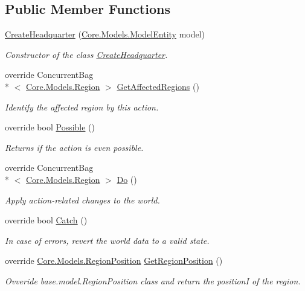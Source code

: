 \subsection*{Public Member Functions}
\begin{DoxyCompactItemize}
\item 
\hyperlink{classCore_1_1Controllers_1_1Actions_1_1CreateHeadquarter_a4c0fe65eb8038f6167d9d9fe42834ee8}{Create\-Headquarter} (\hyperlink{classCore_1_1Models_1_1ModelEntity}{Core.\-Models.\-Model\-Entity} model)
\begin{DoxyCompactList}\small\item\em Constructor of the class \hyperlink{classCore_1_1Controllers_1_1Actions_1_1CreateHeadquarter}{Create\-Headquarter}. \end{DoxyCompactList}\item 
override Concurrent\-Bag\\*
$<$ \hyperlink{classCore_1_1Models_1_1Region}{Core.\-Models.\-Region} $>$ \hyperlink{classCore_1_1Controllers_1_1Actions_1_1CreateHeadquarter_a2d0e5c9eaa6f539581c62f649e76fce7}{Get\-Affected\-Regions} ()
\begin{DoxyCompactList}\small\item\em Identify the affected region by this action. \end{DoxyCompactList}\item 
override bool \hyperlink{classCore_1_1Controllers_1_1Actions_1_1CreateHeadquarter_aae428d8792453bea4aae8dfd9478a1fd}{Possible} ()
\begin{DoxyCompactList}\small\item\em Returns if the action is even possible. \end{DoxyCompactList}\item 
override Concurrent\-Bag\\*
$<$ \hyperlink{classCore_1_1Models_1_1Region}{Core.\-Models.\-Region} $>$ \hyperlink{classCore_1_1Controllers_1_1Actions_1_1CreateHeadquarter_af17ed42c13d869322a61adac0b1911a4}{Do} ()
\begin{DoxyCompactList}\small\item\em Apply action-\/related changes to the world. \end{DoxyCompactList}\item 
override bool \hyperlink{classCore_1_1Controllers_1_1Actions_1_1CreateHeadquarter_a1784d785515ab957f3f634c2907908d5}{Catch} ()
\begin{DoxyCompactList}\small\item\em In case of errors, revert the world data to a valid state. \end{DoxyCompactList}\item 
override \hyperlink{classCore_1_1Models_1_1RegionPosition}{Core.\-Models.\-Region\-Position} \hyperlink{classCore_1_1Controllers_1_1Actions_1_1CreateHeadquarter_aafbd900bc7a38f4268f00f57078d4b4a}{Get\-Region\-Position} ()
\begin{DoxyCompactList}\small\item\em Ovveride base.\-model.\-Region\-Position class and return the position\-I of the region. \end{DoxyCompactList}\end{DoxyCompactItemize}
